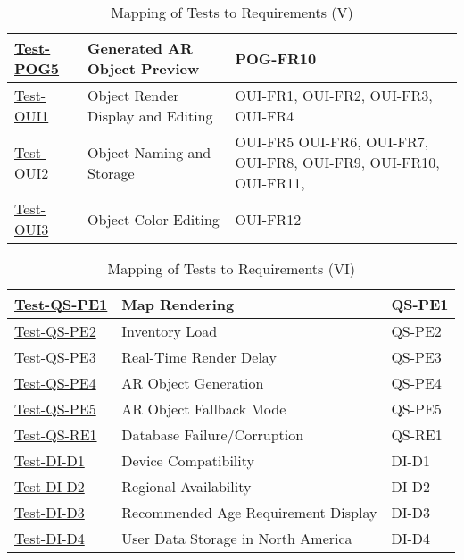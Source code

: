 \documentclass[12pt, titlepage]{article}
\begin{document}
\begin{table}[htpb!]
\begin{tabular}{|l|p{8cm}|p{3cm}|}
    \hline
    \hyperref[itm:Test-POG5]{Test-POG5} & Generated AR Object Preview                           & POG-FR10                                                        \\
    \hline
    \hyperref[itm:Test-OUI1]{Test-OUI1} & Object Render Display and Editing                     & OUI-FR1, OUI-FR2, OUI-FR3, OUI-FR4                              \\
    \hline
    \hyperref[itm:Test-OUI2]{Test-OUI2} & Object Naming and Storage                             & OUI-FR5 OUI-FR6, OUI-FR7, OUI-FR8, OUI-FR9, OUI-FR10, OUI-FR11, \\
    \hline
    \hyperref[itm:Test-OUI3]{Test-OUI3} & Object Color Editing                                  & OUI-FR12                                                        \\
    \hline
  \end{tabular}
  \caption{Mapping of Tests to Requirements (V)}
  \label{tab:test_requirements5}
\end{table}

\begin{table}[htpb!]
  \centering
  \begin{tabular}{|l|p{8cm}|p{3cm}|}
    \hline
    \hyperref[itm:Test-QS-PE1]{Test-QS-PE1} & Map Rendering                       & QS-PE1 \\
    \hline
    \hyperref[itm:Test-QS-PE2]{Test-QS-PE2} & Inventory Load                      & QS-PE2 \\
    \hline
    \hyperref[itm:Test-QS-PE3]{Test-QS-PE3} & Real-Time Render Delay              & QS-PE3 \\
    \hline
    \hyperref[itm:Test-QS-PE4]{Test-QS-PE4} & AR Object Generation                & QS-PE4 \\
    \hline
    \hyperref[itm:Test-QS-PE5]{Test-QS-PE5} & AR Object Fallback Mode             & QS-PE5 \\
    \hline
    \hyperref[itm:Test-QS-RE1]{Test-QS-RE1} & Database Failure/Corruption         & QS-RE1 \\
    \hline
    \hyperref[itm:Test-DI-D1]{Test-DI-D1}   & Device Compatibility                & DI-D1  \\
    \hline
    \hyperref[itm:Test-DI-D2]{Test-DI-D2}   & Regional Availability               & DI-D2  \\
    \hline
    \hyperref[itm:Test-DI-D3]{Test-DI-D3}   & Recommended Age Requirement Display & DI-D3  \\
    \hline
    \hyperref[itm:Test-DI-D4]{Test-DI-D4}   & User Data Storage in North America  & DI-D4  \\
    \hline
  \end{tabular}
  \caption{Mapping of Tests to Requirements (VI)}
  \label{tab:test_requirements6}
\end{table}
\end{document}
